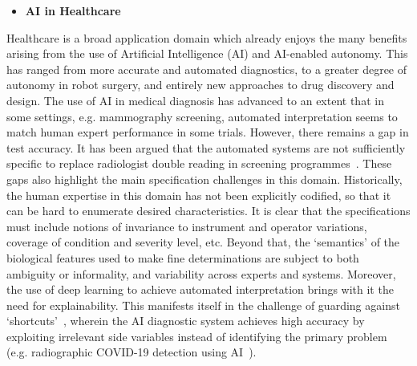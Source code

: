 \documentclass[sigconf,nonacm]{acmart}%
\begin{document}
\begin{itemize}[leftmargin=0.5cm]
	\item \textbf{AI in Healthcare}
\end{itemize}
Healthcare is a broad application domain which already enjoys the many benefits arising from the use of Artificial Intelligence (AI) and AI-enabled autonomy. This has ranged from more accurate and automated diagnostics, to a greater degree of autonomy in robot surgery, and entirely new approaches to drug discovery and design. The use of AI in medical diagnosis has advanced to an extent that in some settings, e.g. mammography screening, automated interpretation seems to match human expert performance in some trials. However, there remains a gap in test accuracy. It has been argued that the automated systems are not sufficiently specific to replace radiologist double reading in screening programmes~\cite{Freemann1872}. These gaps also highlight the main specification challenges in this domain. Historically, the human expertise in this domain has not been explicitly codified, so that it can be hard to enumerate desired characteristics. It is clear that the specifications must include notions of invariance to instrument and operator variations, coverage of condition and severity level, etc. Beyond that, the `semantics' of the biological features used to make fine determinations are subject to both ambiguity or informality, and variability across experts and systems. Moreover, the use of deep learning to achieve automated interpretation brings with it the need for explainability. This manifests itself in the challenge of guarding against `shortcuts'~\cite{degrave2021ai}, wherein the AI diagnostic system achieves high accuracy by exploiting irrelevant side variables instead of identifying the primary problem (e.g. radiographic COVID-19 detection using AI~\cite{degrave2021ai}). 
\end{document}
